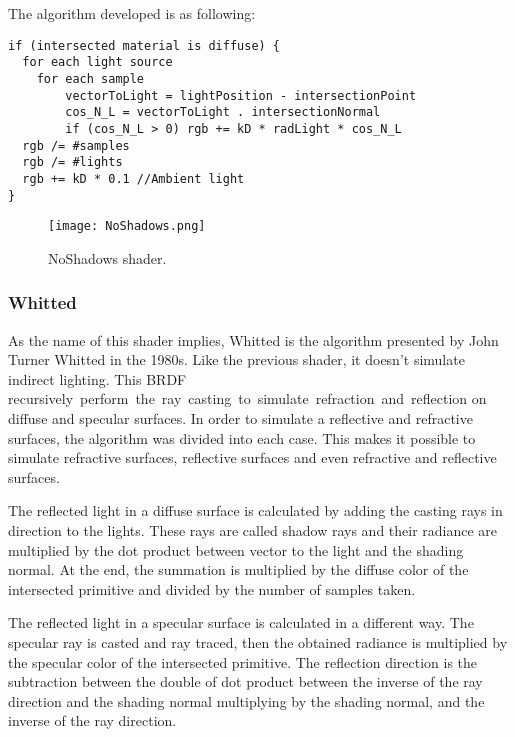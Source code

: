 \par
The algorithm developed is as following:

\begin{lstlisting}[caption={Algorithm of NoShadows Shader}, captionpos=b, label=NoShadows]
if (intersected material is diffuse) {
  for each light source
  	for each sample
	    vectorToLight = lightPosition - intersectionPoint
	    cos_N_L = vectorToLight . intersectionNormal
	    if (cos_N_L > 0) rgb += kD * radLight * cos_N_L
  rgb /= #samples
  rgb /= #lights
  rgb += kD * 0.1 //Ambient light
}
\end{lstlisting}

\begin{figure}[H]
	\centering
	\caption{NoShadows shader.}
	\label{NoShadows shader.}
	\texttt{[image: NoShadows.png]}
\end{figure}

\subsubsection{Whitted}

\par
As the name of this shader implies, Whitted is the algorithm presented by John Turner Whitted in the 1980s.
Like the previous shader, it doesn't simulate indirect lighting.
This BRDF recursively perform the ray casting to simulate refraction and reflection on diffuse and specular surfaces.
In order to simulate a reflective and refractive surfaces, the algorithm was divided into each case.
This makes it possible to simulate refractive surfaces, reflective surfaces and even refractive and reflective surfaces.

\par
The reflected light in a diffuse surface is calculated by adding the casting rays in direction to the lights.
These rays are called shadow rays and their radiance are multiplied by the dot product between vector to the light and the shading normal.
At the end, the summation is multiplied by the diffuse color of the intersected primitive and divided by the number of samples taken.

\par
The reflected light in a specular surface is calculated in a different way.
The specular ray is casted and ray traced, then the obtained radiance is multiplied by the specular color of the intersected primitive.
The reflection direction is the subtraction between the double of dot product between the inverse of the ray direction and the shading normal multiplying by the shading normal, and the inverse of the ray direction.

